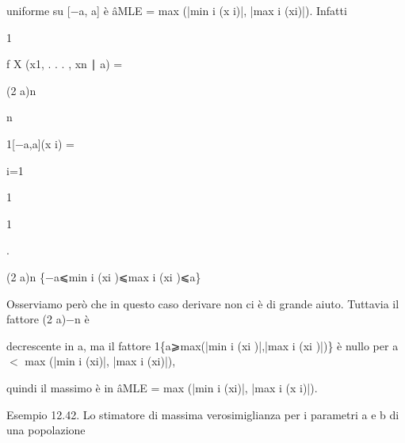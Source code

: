 \documentclass[a4paper,portrait,12pt]{article}
\begin{document}
\begin{flushleft}
uniforme su [$-$a, a] \`{e} âMLE = max (|min i (x i)|, |max i (xi)|). Infatti
\end{flushleft}


1


\begin{flushleft}
f X (x1, . . . , xn ∣ a) =
\end{flushleft}


\begin{flushleft}
(2 a)n
\end{flushleft}





\begin{flushleft}
n
\end{flushleft}





\begin{flushleft}
1[$-$a,a](x i) =
\end{flushleft}


\begin{flushleft}
i=1
\end{flushleft}





1


1


.


\begin{flushleft}
(2 a)n \{$-$a⩽min i (xi )⩽max i (xi )⩽a\}
\end{flushleft}





\begin{flushleft}
Osserviamo per\`{o} che in questo caso derivare non ci \`{e} di grande aiuto. Tuttavia il fattore (2 a)$-$n \`{e}
\end{flushleft}


\begin{flushleft}
decrescente in a, ma il fattore 1\{a⩾max(|min i (xi )|,|max i (xi )|)\} \`{e} nullo per a $<$ max (|min i (xi)|, |max i (xi)|),
\end{flushleft}


\begin{flushleft}
quindi il massimo \`{e} in âMLE = max (|min i (xi)|, |max i (x i)|).
\end{flushleft}


\begin{flushleft}
Esempio 12.42. Lo stimatore di massima verosimiglianza per i parametri a e b di una popolazione
\end{flushleft}
\end{document}
